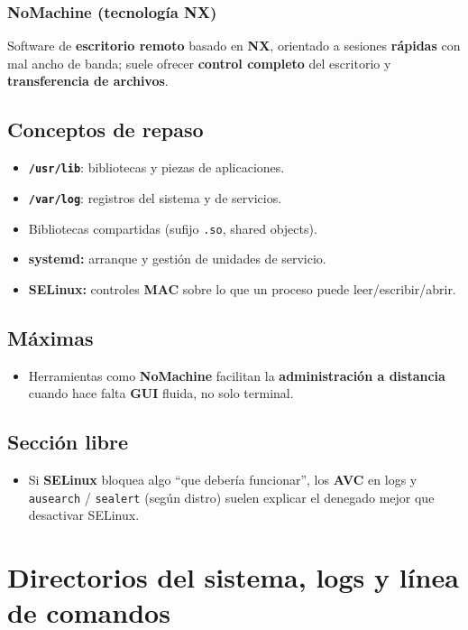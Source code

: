 \documentclass[11pt, letterpaper]{article}
\begin{document}
\subsubsection{NoMachine (tecnología NX)}
\label{sec:orga72c709}
Software de \textbf{escritorio remoto} basado en \textbf{NX}, orientado a sesiones \textbf{rápidas} con mal ancho de banda; suele ofrecer \textbf{control completo} del escritorio y \textbf{transferencia de archivos}.
\subsection{Conceptos de repaso}
\label{sec:orga89930e}

\begin{itemize}
\item \textbf{\texttt{/usr/lib}}: bibliotecas y piezas de aplicaciones.
\item \textbf{\texttt{/var/log}}: registros del sistema y de servicios.
\item Bibliotecas compartidas (sufijo \texttt{.so}, shared objects).
\item \textbf{systemd:} arranque y gestión de unidades de servicio.
\item \textbf{SELinux:} controles \textbf{MAC} sobre lo que un proceso puede leer/escribir/abrir.
\end{itemize}
\subsection{Máximas}
\label{sec:org9b76064}

\begin{itemize}
\item Herramientas como \textbf{NoMachine} facilitan la \textbf{administración a distancia} cuando hace falta \textbf{GUI} fluida, no solo terminal.
\end{itemize}
\subsection{Sección libre}
\label{sec:org523d226}

\begin{itemize}
\item Si \textbf{SELinux} bloquea algo “que debería funcionar”, los \textbf{AVC} en logs y \texttt{ausearch} / \texttt{sealert} (según distro) suelen explicar el denegado mejor que desactivar SELinux.
\end{itemize}
\section{Directorios del sistema, logs y línea de comandos}
\label{sec:org9533ab1}
\end{document}
